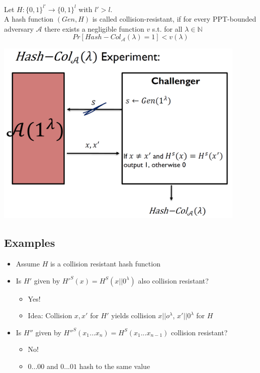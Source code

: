\begin{definition}
	Let $H: \{0,1\}^{l'} \to \{0,1\}^{l}$ with $l' > l$.\\
    A hash function $(Gen,H)$ is called collision-resistant, if for every PPT-bounded adversary $\mathcal{A}$ there exists a negligible function $v$ s.t. for all $\lambda \in \mathbb{N}$
    $$Pr[Hash-Col_{\mathcal{A}}(\lambda)=1] < v(\lambda)$$
   	\begin{center}
		\includegraphics[width=120mm]{Graphics/Hash Functions/hf2.png}
	\end{center}
\end{definition}

	\subsection{Examples}
		\begin{itemize}
			\item Assume $H$ is a collision resistant hash function
			\item Is $H'$ given by $H'^S(x) = H^S(x || 0^{\lambda})$ also collision resistant?
			\begin{itemize}
				\item Yes!
				\item Idea: Collision $x,x'$ for $H'$ yields collision $x || o^{\lambda}$, $x' || 0^{\lambda}$ for $H$
			\end{itemize}
			\item Is $H''$ given by $H''^S(x_1...x_n) = H^S(x_1...x_{n-1})$ collision resistant?
			\begin{itemize}
				\item No!
				\item $0...00$ and $0...01$ hash to the same value
			\end{itemize}
		\end{itemize}


